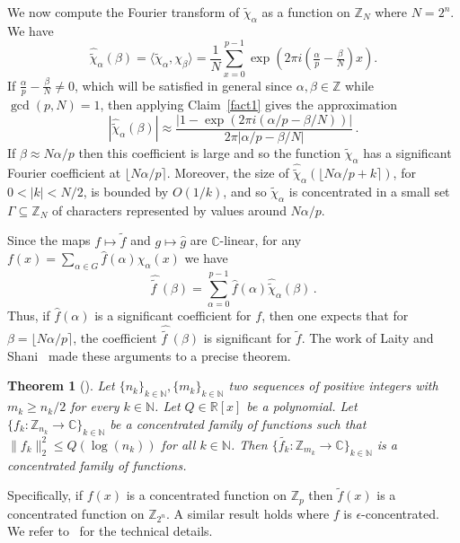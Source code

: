 \documentclass[11pt]{article}
\newtheorem{theorem}{Theorem}
\theoremstyle{definition}
\newcommand{\N}{\mathbb{N}}
\newcommand{\Z}{\mathbb{Z}}
\newcommand{\R}{\mathbb{R}}
\newcommand{\C}{\mathbb{C}}
\begin{document}
\bigskip
We now compute the Fourier transform of $\widetilde{\chi}_\alpha$ as a function on $\Z_N$ where $N = 2^n$.
We have
\[
    \widehat{\widetilde{\chi}}_\alpha ( \beta ) = \langle \widetilde{\chi}_\alpha, \chi_\beta \rangle = \frac{1}{N} \sum_{x=0}^{p-1} \exp\left( 2 \pi i \left( \tfrac{\alpha}{p} - \tfrac{\beta}{N} \right) x \right ).
\]
If $\tfrac{\alpha}{p} - \tfrac{\beta}{N} \ne 0$, which will be satisfied in general since $\alpha, \beta  \in \Z$ while $\gcd( p, N) = 1$, then applying Claim~\ref{fact1} gives the approximation
\[
    \left|\widehat{\widetilde{\chi}}_\alpha ( \beta ) \right|\approx \frac{|1 - \exp( 2 \pi i( \alpha/p - \beta/N))|}{2 \pi |\alpha/p - \beta/N|} \,.
\]
If $\beta \approx N \alpha / p$ then this coefficient is large and so the function $\widetilde{\chi}_\alpha$ has a significant Fourier coefficient at $\lfloor N \alpha / p \rceil$. Moreover, the size of $\widehat{\widetilde{\chi}}_\alpha(\lfloor N \alpha / p + k \rceil)$, for $0<|k|<N/2$, is bounded by $O({1}/{k})$, and so $\widetilde{\chi}_\alpha$ is concentrated in a small set $\Gamma \subseteq \Z_N$ of characters represented by values around $N \alpha / p$.

Since the maps $f \mapsto \widetilde{f}$ and $g \mapsto \widehat{g}$ are $\C$-linear, for any $f(x) = \sum_{\alpha\in G} \widehat{f}(\alpha)\chi_\alpha(x)$ we have
\[
    \widehat{\widetilde{f_{\;}}}(\beta)= \sum_{\alpha=0}^{p-1} \widehat{f}(\alpha) \widehat{\widetilde{\chi}}_\alpha ( \beta ) \,.
\]
Thus, if $\widehat{f}(\alpha)$ is a significant coefficient for $f$, then one expects that for $\beta = \lfloor N \alpha / p \rceil$, the coefficient $\widehat{\widetilde{f_{\;}}}(\beta)$ is significant for $\widetilde{f}$.
The work of Laity and Shani~\cite{LS} made these arguments to a precise theorem.

\begin{theorem}[{\cite[Theorem 1.1]{LS}}]\label{thm:LS}
    Let $\{n_k\}_{k\in\N},\{m_k\}_{k\in\N}$ two sequences of positive integers with $m_k \geq n_k/2$ for every $k\in\N$.
    Let $Q\in \R[x]$ be a polynomial.
    Let $\{f_k:\Z_{n_k}\to\C\}_{k\in\N}$ be a concentrated family of functions such that $\|f_k\|_2^2 \leq Q(\log(n_k))$ for all $k\in \N$.
    Then $\{\widetilde{f_k}:\Z_{m_k}\to\C\}_{k\in\N}$ is a concentrated family of functions.
\end{theorem}

Specifically, if $f(x)$ is a concentrated function on $\Z_p$ then $\widetilde{f}(x)$ is a concentrated function on $\Z_{2^n}$. A similar result holds where $f$ is $\epsilon$-concentrated. We refer to~\cite{LS} for the technical details.
\end{document}
